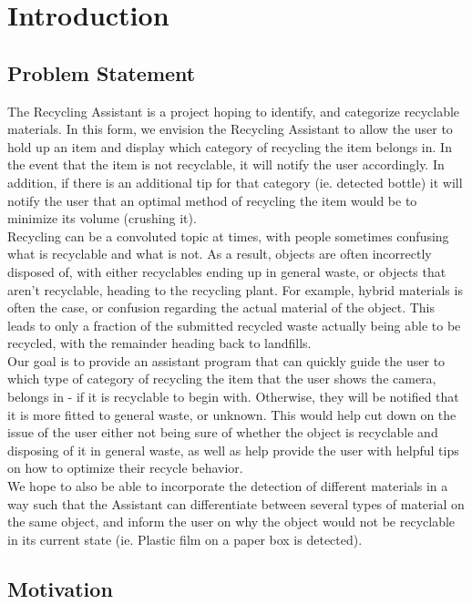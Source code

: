 \documentclass[conference]{IEEEtran}
\begin{document}
\newpage

\section{Introduction}
\subsection{Problem Statement}
The Recycling Assistant is a project hoping to identify, and categorize recyclable materials. In this form, we envision the Recycling Assistant to allow the user to hold up an item and display which category of recycling the item belongs in. In the event that the item is not recyclable, it will notify the user accordingly. In addition, if there is an additional tip for that category (ie. detected bottle) it will notify the user that an optimal method of recycling the item would be to minimize its volume (crushing it). \\
Recycling can be a convoluted topic at times, with people sometimes confusing what is recyclable and what is not. As a result, objects are often incorrectly disposed of, with either recyclables ending up in general waste, or objects that aren't recyclable, heading to the recycling plant. For example, hybrid materials is often the case, or confusion regarding the actual material of the object. This leads to only a fraction of the submitted recycled waste actually being able to be recycled, with the remainder heading back to landfills. \\

Our goal is to provide an assistant program that can quickly guide the user to which type of category of recycling the item that the user shows the camera, belongs in - if it is recyclable to begin with. Otherwise, they will be notified that it is more fitted to general waste, or unknown. This would help cut down on the issue of the user either not being sure of whether the object is recyclable and disposing of it in general waste, as well as help provide the user with helpful tips on how to optimize their recycle behavior.\\
We hope to also be able to incorporate the detection of different materials in a way such that the Assistant can differentiate between several types of material on the same object, and inform the user on why the object would not be recyclable in its current state (ie. Plastic film on a paper box is detected).\\

\subsection{Motivation}
\end{document}
